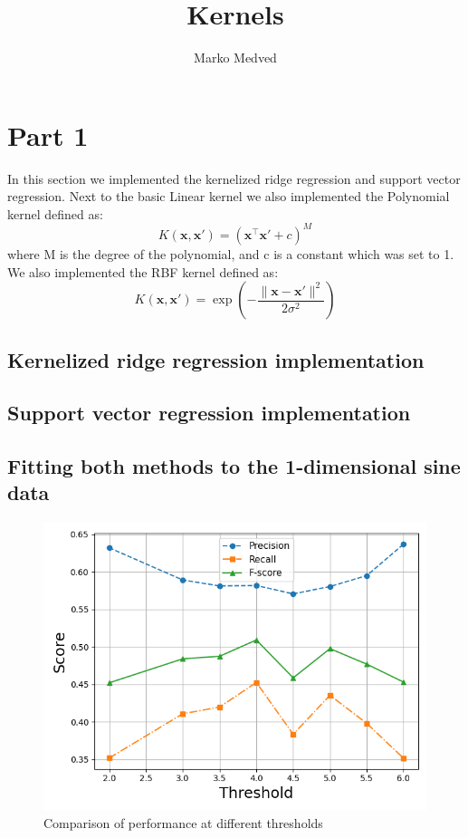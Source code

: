 \documentclass[9pt]{IEEEtran}
\title{\vspace{0ex}
Kernels}
\author{Marko Medved\vspace{-4.0ex}}
\begin{document}
\maketitle


\section{Part 1}
In this section we implemented the kernelized ridge regression and support vector
regression. Next to the basic Linear kernel we also implemented the Polynomial 
kernel defined as: 
\[
K(\mathbf{x}, \mathbf{x}') = (\mathbf{x}^\top \mathbf{x}' + c)^M
\]
where M is the degree of the polynomial, and c is a constant which was set to 1.
We also implemented the RBF kernel defined as: 
\[
K(\mathbf{x}, \mathbf{x}') = \exp\left(-\frac{\|\mathbf{x} - \mathbf{x}'\|^2}{2\sigma^2}\right)
\]




\subsection{Kernelized ridge regression implementation}

\subsection{Support vector regression implementation}

\subsection{Fitting both methods to the 1-dimensional sine data}




  \begin{figure}[h]
    \centering
    \includegraphics[width=0.99\columnwidth]{figures/thresholds.png}
    \caption{Comparison of performance at different thresholds}
    \label{fig:thresholds}
\end{figure}






\end{document}
